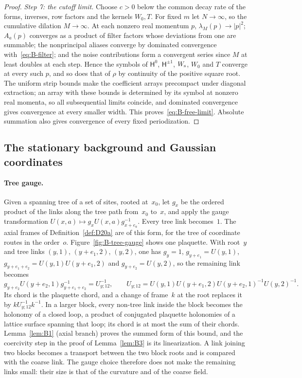 \begin{proof}
\emph{Step 7: the cutoff limit.} Choose $c>0$ below the common decay rate of the forms, inverses, row factors and the kernels $W_0,T$. For fixed $m$ let $N\to\infty$, so the cumulative dilation $M\to\infty$. At each nonzero real momentum $p$, $\lambda_M(p)\to|p|^2$; $A_a(p)$ converges as a product of filter factors whose deviations from one are summable; the nonprincipal aliases converge by dominated convergence with~\eqref{eq:B-filter}; and the noise contributions form a convergent series since $M$ at least doubles at each step. Hence the symbols of $\mathsf H^0$, $\mathsf H^{\pm1}$, $W_{\rm s}$, $W_0$ and $T$ converge at every such $p$, and so does that of $\rho$ by continuity of the positive square root. The uniform strip bounds make the coefficient arrays precompact under diagonal extraction; an array with these bounds is determined by its symbol at nonzero real momenta, so all subsequential limits coincide, and dominated convergence gives convergence at every smaller width. This proves~\eqref{eq:B-free-limit}. Absolute summation also gives convergence of every fixed periodization.
\end{proof}

\subsection{The stationary background and Gaussian coordinates}\label{subsec:B-stationary}

\paragraph{Tree gauge.} Given a spanning tree of a set of sites, rooted at~$x_0$, let $g_x$ be the ordered product of the links along the tree path from~$x_0$ to~$x$, and apply the gauge transformation $U(x,a)\mapsto g_xU(x,a)g_{x+e_a}^{-1}$. Every tree link becomes~$1$. The axial frames of Definition~\ref{def:D20a} are of this form, for the tree of coordinate routes in the order~$o$. Figure~\ref{fig:B-tree-gauge} shows one plaquette. With root~$y$ and tree links $(y,1)$, $(y+e_1,2)$, $(y,2)$, one has $g_y=1$, $g_{y+e_1}=U(y,1)$, $g_{y+e_1+e_2}=U(y,1)U(y+e_1,2)$ and $g_{y+e_2}=U(y,2)$, so the remaining link becomes
\begin{equation*}
g_{y+e_2}U(y+e_2,1)g_{y+e_1+e_2}^{-1}=U_{y;12}^{-1},\qquad
U_{y;12}=U(y,1)U(y+e_1,2)U(y+e_2,1)^{-1}U(y,2)^{-1}.
\end{equation*}
Its chord is the plaquette chord, and a change of frame~$k$ at the root replaces it by $kU_{y;12}^{-1}k^{-1}$. In a larger block, every non-tree link inside the block becomes the holonomy of a closed loop, a product of conjugated plaquette holonomies of a lattice surface spanning that loop; its chord is at most the sum of their chords. Lemma~\ref{lem:B1} (axial branch) proves the summed form of this bound, and the coercivity step in the proof of Lemma~\ref{lem:B3} is its linearization. A link joining two blocks becomes a transport between the two block roots and is compared with the coarse link. The gauge choice therefore does not make the remaining links small: their size is that of the curvature and of the coarse field.

